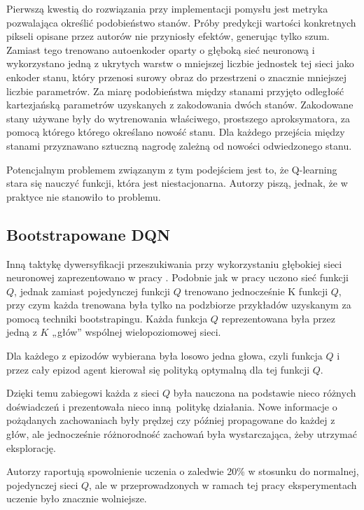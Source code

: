 \documentclass[polish,master,a4paper,oneside]{ppfcmthesis}
\begin{document}
Pierwszą kwestią do rozwiązania przy implementacji pomysłu jest metryka pozwalająca określić podobieństwo stanów. Próby predykcji wartości konkretnych pikseli opisane przez autorów nie przyniosły efektów, generując tylko szum. Zamiast tego trenowano autoenkoder oparty o głęboką sieć neuronową i wykorzystano jedną z ukrytych warstw o mniejszej liczbie jednostek tej sieci jako enkoder stanu, który przenosi surowy obraz do przestrzeni o znacznie mniejszej liczbie parametrów. Za miarę podobieństwa między stanami przyjęto odległość kartezjańską parametrów uzyskanych z zakodowania dwóch stanów. Zakodowane stany używane były do wytrenowania właściwego, prostszego aproksymatora, za pomocą którego którego określano nowość stanu. Dla każdego przejścia między stanami przyznawano sztuczną nagrodę zależną od nowości odwiedzonego stanu.

Potencjalnym problemem związanym z tym podejściem jest to, że Q-learning stara się nauczyć funkcji, która jest niestacjonarna. Autorzy piszą, jednak, że w praktyce nie stanowiło to problemu.

\subsection{Bootstrapowane DQN}
Inną taktykę dywersyfikacji przeszukiwania przy wykorzystaniu głębokiej sieci neuronowej zaprezentowano w pracy \cite{DBLP:journals/corr/OsbandBPR16}. Podobnie jak w pracy \cite{DBLP:journals/corr/StadieLA15} uczono sieć funkcji $Q$, jednak zamiast pojedynczej funkcji $Q$ trenowano jednocześnie K funkcji $Q$, przy czym każda trenowana była tylko na podzbiorze przykładów uzyskanym za pomocą techniki bootstrapingu. Każda funkcja $Q$ reprezentowana była przez jedną z $K$ „głów” wspólnej wielopoziomowej sieci.

Dla każdego z epizodów wybierana była losowo jedna głowa, czyli funkcja $Q$ i przez cały epizod agent kierował się polityką optymalną dla tej funkcji $Q$.

Dzięki temu zabiegowi każda z sieci $Q$ była nauczona na podstawie nieco różnych doświadczeń i prezentowała nieco inną politykę działania. Nowe informacje o pożądanych zachowaniach były prędzej czy później propagowane do każdej z głów, ale jednocześnie różnorodność zachowań była wystarczająca, żeby utrzymać eksplorację.

Autorzy raportują spowolnienie uczenia o zaledwie 20\% w stosunku do normalnej, pojedynczej sieci $Q$, ale w przeprowadzonych w ramach tej pracy eksperymentach uczenie było znacznie wolniejsze.
\end{document}

